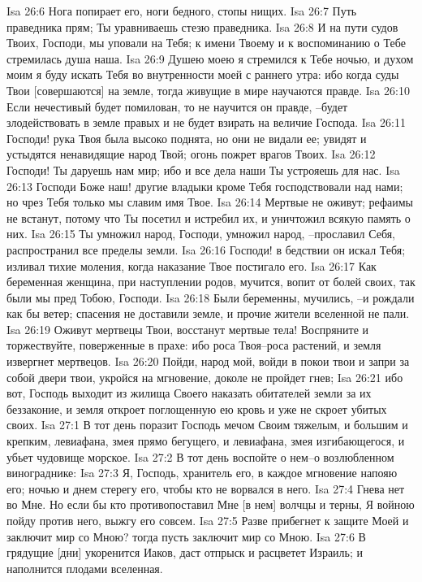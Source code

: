 Isa 26:6  Нога попирает его, ноги бедного, стопы нищих.
Isa 26:7  Путь праведника прям; Ты уравниваешь стезю праведника.
Isa 26:8  И на пути судов Твоих, Господи, мы уповали на Тебя; к имени Твоему и к воспоминанию о Тебе стремилась душа наша.
Isa 26:9  Душею моею я стремился к Тебе ночью, и духом моим я буду искать Тебя во внутренности моей с раннего утра: ибо когда суды Твои [совершаются] на земле, тогда живущие в мире научаются правде.
Isa 26:10  Если нечестивый будет помилован, то не научится он правде, --будет злодействовать в земле правых и не будет взирать на величие Господа.
Isa 26:11  Господи! рука Твоя была высоко поднята, но они не видали ее; увидят и устыдятся ненавидящие народ Твой; огонь пожрет врагов Твоих.
Isa 26:12  Господи! Ты даруешь нам мир; ибо и все дела наши Ты устрояешь для нас.
Isa 26:13  Господи Боже наш! другие владыки кроме Тебя господствовали над нами; но чрез Тебя только мы славим имя Твое.
Isa 26:14  Мертвые не оживут; рефаимы не встанут, потому что Ты посетил и истребил их, и уничтожил всякую память о них.
Isa 26:15  Ты умножил народ, Господи, умножил народ, --прославил Себя, распространил все пределы земли.
Isa 26:16  Господи! в бедствии он искал Тебя; изливал тихие моления, когда наказание Твое постигало его.
Isa 26:17  Как беременная женщина, при наступлении родов, мучится, вопит от болей своих, так были мы пред Тобою, Господи.
Isa 26:18  Были беременны, мучились, --и рождали как бы ветер; спасения не доставили земле, и прочие жители вселенной не пали.
Isa 26:19  Оживут мертвецы Твои, восстанут мертвые тела! Воспряните и торжествуйте, поверженные в прахе: ибо роса Твоя--роса растений, и земля извергнет мертвецов.
Isa 26:20  Пойди, народ мой, войди в покои твои и запри за собой двери твои, укройся на мгновение, доколе не пройдет гнев;
Isa 26:21  ибо вот, Господь выходит из жилища Своего наказать обитателей земли за их беззаконие, и земля откроет поглощенную ею кровь и уже не скроет убитых своих.
Isa 27:1  В тот день поразит Господь мечом Своим тяжелым, и большим и крепким, левиафана, змея прямо бегущего, и левиафана, змея изгибающегося, и убьет чудовище морское.
Isa 27:2  В тот день воспойте о нем--о возлюбленном винограднике:
Isa 27:3  Я, Господь, хранитель его, в каждое мгновение напояю его; ночью и днем стерегу его, чтобы кто не ворвался в него.
Isa 27:4  Гнева нет во Мне. Но если бы кто противопоставил Мне [в нем] волчцы и терны, Я войною пойду против него, выжгу его совсем.
Isa 27:5  Разве прибегнет к защите Моей и заключит мир со Мною? тогда пусть заключит мир со Мною.
Isa 27:6  В грядущие [дни] укоренится Иаков, даст отпрыск и расцветет Израиль; и наполнится плодами вселенная.
